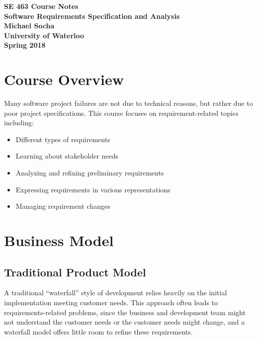 \documentclass[12pt,titlepage]{article}
\let\stdsection\section
\renewcommand\section{\clearpage\stdsection}
\begin{document}
  \begin{titlepage}
    \vspace*{\fill}
    \centering

    \textbf{\Huge SE 463 Course Notes} \\ [0.4em]
    \textbf{\Large Software Requirements Specification and Analysis} \\ [1em]
    \textbf{\Large Michael Socha} \\ [1em]
    \textbf{\large University of Waterloo} \\
    \textbf{\large Spring 2018} \\
    \vspace*{\fill}
  \end{titlepage}

  \newpage 


  \tableofcontents

  \newpage


  \section{Course Overview}
    Many software project failures are not due to technical reasons, but rather due to poor project specifications. This course
    focuses on requirement-related topics including:
    \begin{itemize}
      \item Different types of requirements
      \item Learning about stakeholder needs
      \item Analyzing and refining preliminary requirements
      \item Expressing requirements in various representations
      \item Managing requirement changes
    \end{itemize}

  \section{Business Model}
    \subsection{Traditional Product Model}
      A traditional ``waterfall'' style of development relies heavily on the initial implementation meeting customer needs. This
      approach often leads to requirements-related problems, since the business and development team might not understand the
      customer needs or the customer needs might change, and a waterfall model offers little room to refine these requirements.
\end{document}
